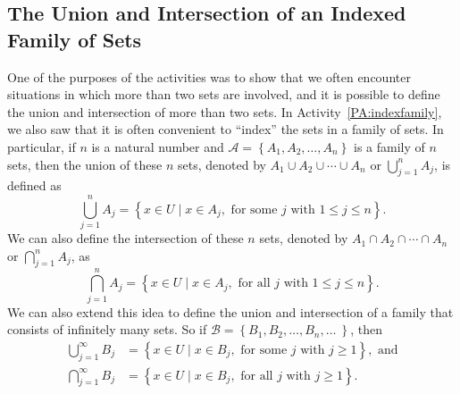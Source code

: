 \subsection*{The Union and Intersection of an Indexed Family of Sets}
One of the purposes of the \typel activities was to show that we often encounter situations in which more than two sets are involved, and it is possible to define the union and intersection of more than two sets.  In \typeu Activity~\ref*{PA:indexfamily}, we also saw that it is often convenient to ``index'' the sets in a family of sets.  In particular, if $n$ is a natural number and 
$\mathscr{A} = \left\{ A_1, A_2, \ldots , A_n \right\}$ is a family of $n$ sets, then the union of these $n$ sets, denoted by $A_1 \cup A_2 \cup \cdots \cup A_n$ or 
$\bigcup\limits_{j=1}^{n}A_j$, \label{sym:unionfiniteindex} is defined as
\[
\bigcup_{j=1}^{n}A_j = 
\left\{ x \in U \mid x \in A_j, \text{ for some } j \text{ with } 1 \leq j \leq n \right\}\!. 
\]
We can also define the intersection of these $n$ sets, denoted by 
$A_1 \cap A_2 \cap \cdots \cap A_n$ or $\bigcap\limits_{j=1}^{n}A_j$, 
\label{sym:interfiniteindex} as
\[
\bigcap_{j=1}^{n}A_j = 
\left\{ x \in U \mid x \in A_j, \text{ for all } j \text{ with } 1 \leq j \leq n \right\}\!. 
\]
We can also extend this idea to define the union and intersection of a family that consists of infinitely many sets.  So if $\mathscr{B} = \left\{ B_1, B_2, \ldots , B_n, \ldots \: \right\}$, then
\[
\begin{aligned}
\bigcup_{j=1}^{\infty}B_j &= 
\left\{ x \in U \mid x \in B_j, \text{ for some } j \text{ with } j \geq 1 \right\}\!, 
\label{sym:unioninfiniteindex} \text{ and} \\
\bigcap_{j=1}^{\infty}B_j &= 
\left\{ x \in U \mid x \in B_j, \text{ for all } j \text{ with } j \geq 1 \right\}\!. 
\end{aligned}
\]
\hbreak

